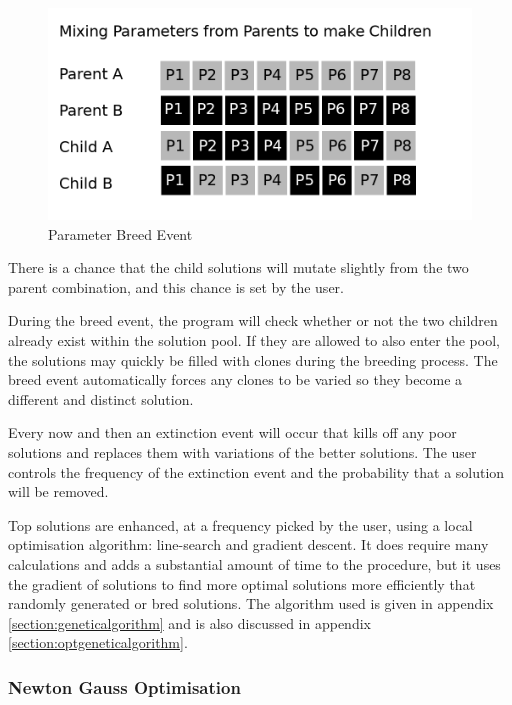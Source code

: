 \begin{figure}[h]
  \begin{center}
    \includegraphics[scale=0.30]{chapters/potentials_fe_pd_ru/images/breeding.png}
    \caption{Parameter Breed Event}
    \label{fig:gabreedevent}
  \end{center}
\end{figure}

There is a chance that the child solutions will mutate slightly from the two parent combination, and this chance is set by the user.

During the breed event, the program will check whether or not the two children already exist within the solution pool.  If they are allowed to also enter the pool, the solutions may quickly be filled with clones during the breeding process.  The breed event automatically forces any clones to be varied so they become a different and distinct solution.

Every now and then an extinction event will occur that kills off any poor solutions and replaces them with variations of the better solutions.  The user controls the frequency of the extinction event and the probability that a solution will be removed.

Top solutions are enhanced, at a frequency picked by the user, using a local optimisation algorithm: line-search and gradient descent.  It does require many calculations and adds a substantial amount of time to the procedure, but it uses the gradient of solutions to find more optimal solutions more efficiently that randomly generated or bred solutions.  The algorithm used is given in appendix \ref{section:geneticalgorithm} and is also discussed in appendix \ref{section:optgeneticalgorithm}.


\subsubsection{Newton Gauss Optimisation}

